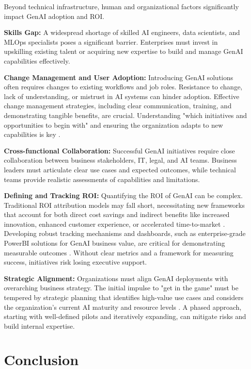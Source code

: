 \documentclass[10pt,twocolumn,letterpaper]{article}
\begin{document}
Beyond technical infrastructure, human and organizational factors significantly impact GenAI adoption and ROI.

\textbf{Skills Gap:} A widespread shortage of skilled AI engineers, data scientists, and MLOps specialists poses a significant barrier. Enterprises must invest in upskilling existing talent or acquiring new expertise to build and manage GenAI capabilities effectively.

\textbf{Change Management and User Adoption:} Introducing GenAI solutions often requires changes to existing workflows and job roles. Resistance to change, lack of understanding, or mistrust in AI systems can hinder adoption. Effective change management strategies, including clear communication, training, and demonstrating tangible benefits, are crucial. Understanding "which initiatives and opportunities to begin with" and ensuring the organization adapts to new capabilities is key \cite{openalex_w4400993506}.

\textbf{Cross-functional Collaboration:} Successful GenAI initiatives require close collaboration between business stakeholders, IT, legal, and AI teams. Business leaders must articulate clear use cases and expected outcomes, while technical teams provide realistic assessments of capabilities and limitations.

\textbf{Defining and Tracking ROI:} Quantifying the ROI of GenAI can be complex. Traditional ROI attribution models may fall short, necessitating new frameworks that account for both direct cost savings and indirect benefits like increased innovation, enhanced customer experience, or accelerated time-to-market \cite{crossref_10_2139_ssrn_6374778}. Developing robust tracking mechanisms and dashboards, such as enterprise-grade PowerBI solutions for GenAI business value, are critical for demonstrating measurable outcomes \cite{github_ankitakapoor980_genai_roi_powerbi_dashboard}. Without clear metrics and a framework for measuring success, initiatives risk losing executive support.

\textbf{Strategic Alignment:} Organizations must align GenAI deployments with overarching business strategy. The initial impulse to "get in the game" must be tempered by strategic planning that identifies high-value use cases and considers the organization's current AI maturity and resource levels \cite{openalex_w4400993506}. A phased approach, starting with well-defined pilots and iteratively expanding, can mitigate risks and build internal expertise.


\section{Conclusion}
\end{document}
